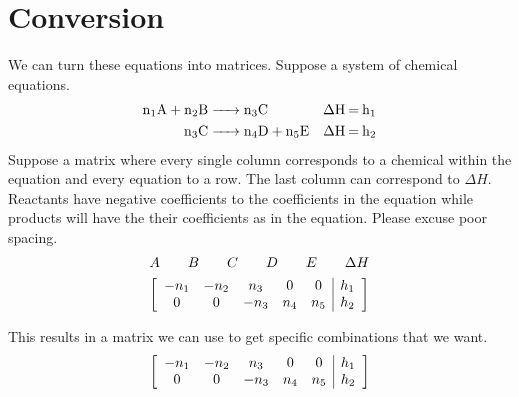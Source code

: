 \documentclass[11pt]{article}
\begin{document}
    \section{Conversion}
        We can turn these equations into matrices.
        Suppose a system of chemical equations. 
        \begin{align}
            \ce{n_1A + n_2B} & \ce{-> n_3C} & \ce{\Delta H = h_1}\\
            \ce{n_3C} & \ce{-> n_4D + n_5E} & \ce{\Delta H = h_2}
        \end{align}
        Suppose a matrix where every single column corresponds to a chemical within the equation and every equation to a row.
        The last column can correspond to $\Delta H$.
        Reactants have negative coefficients to the coefficients in the equation while products will have the their coefficients as in the equation.
        Please excuse poor spacing.
        \begin{gather*}
            \begin{array}{c c c c c c c c c c c c}
                A && B && C && D && E && \Delta H
            \end{array}\\
            \left[ 
                \begin{array}{c c c c c | c}
                    -n_1 & -n_2 & n_3 & 0 & 0   & h_1\\
                    0 & 0 & -n_3 & n_4 & n_5    & h_2
                \end{array}
            \right]
        \end{gather*}

        This results in a matrix we can use to get specific combinations that we want.
        \begin{equation}
            \left[ 
                \begin{array}{c c c c c | c}
                    -n_1 & -n_2 & n_3 & 0 & 0   & h_1\\
                    0 & 0 & -n_3 & n_4 & n_5    & h_2
                \end{array}
            \right]
        \end{equation}
\end{document}
